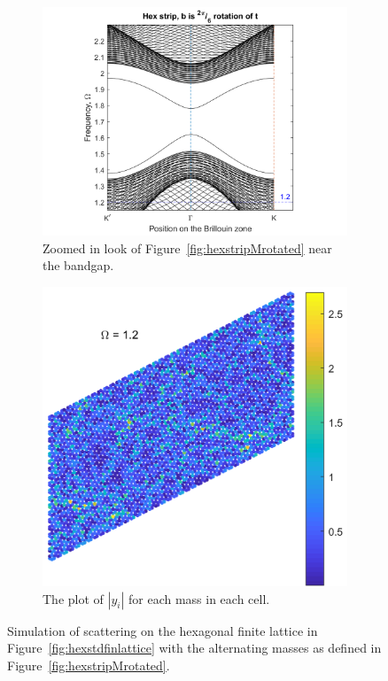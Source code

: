 \begin{figure}
\centering
\begin{subfigure}[b]{.5\textwidth}
  \centering
  \includegraphics[width=1.1\linewidth]{imgs/hexstripperturbMrotatedrand.png}
  \caption{Zoomed in look of Figure~\ref{fig:hexstripMrotated} near the bandgap.}
\label{fig:sub1}
\end{subfigure}%
\begin{subfigure}[b]{.5\textwidth}
  \centering
  \includegraphics[width=1\linewidth]{imgs/hexstdrandscat.png}
  \caption{The plot of $|y_i|$ for each mass in each cell.}
  \label{fig:sub2}
\end{subfigure}
\caption{Simulation of scattering on the hexagonal finite lattice in
  Figure~\ref{fig:hexstdfinlattice} with the alternating masses as defined in
  Figure~\ref{fig:hexstripMrotated}.}
\label{fig:randscat}
\end{figure}

